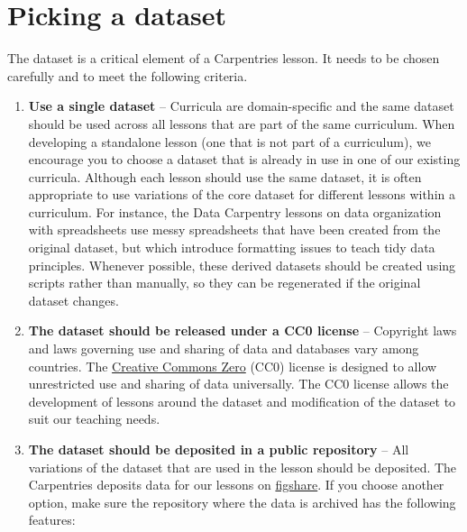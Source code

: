 \documentclass[
]{book}
\begin{document}
\hypertarget{picking-a-dataset}{%
\section{Picking a dataset}\label{picking-a-dataset}}

The dataset is a critical element of a Carpentries lesson. It needs to be chosen carefully
and to meet the following criteria.

\begin{enumerate}
\def\labelenumi{\arabic{enumi}.}
\item
  \textbf{Use a single dataset} -- Curricula are domain-specific and the same dataset should be
  used across all lessons that are part of the same curriculum. When developing a
  standalone lesson (one that is not part of a curriculum), we encourage you to choose a
  dataset that is already in
  use in one of our existing curricula. Although each lesson should use the same dataset,
  it is often appropriate to use variations of the core dataset for different lessons within a
  curriculum. For instance, the Data Carpentry lessons on data organization with spreadsheets
  use messy spreadsheets that have been created from the
  original dataset, but which introduce formatting issues to teach tidy data principles.
  Whenever possible, these derived datasets should be created using scripts rather than
  manually, so they can be regenerated if the original dataset changes.
\item
  \textbf{The dataset should be released under a CC0 license} -- Copyright laws and laws
  governing use and sharing of data and databases vary among countries. The \href{https://creativecommons.org/share-your-work/public-domain/cc0/}{Creative Commons
  Zero} (CC0) license is designed to allow unrestricted use and sharing of data universally. The CC0
  license allows the development of lessons around the dataset and modification of the dataset
  to suit our teaching needs.
\item
  \textbf{The dataset should be deposited in a public repository} -- All variations of the
  dataset that are used in the lesson should be deposited. The Carpentries deposits
  data for our lessons on \href{https://figshare.com/}{figshare}.
  If you choose another option, make sure the repository where the data is archived
  has the following features:


\end{enumerate}
\end{document}

